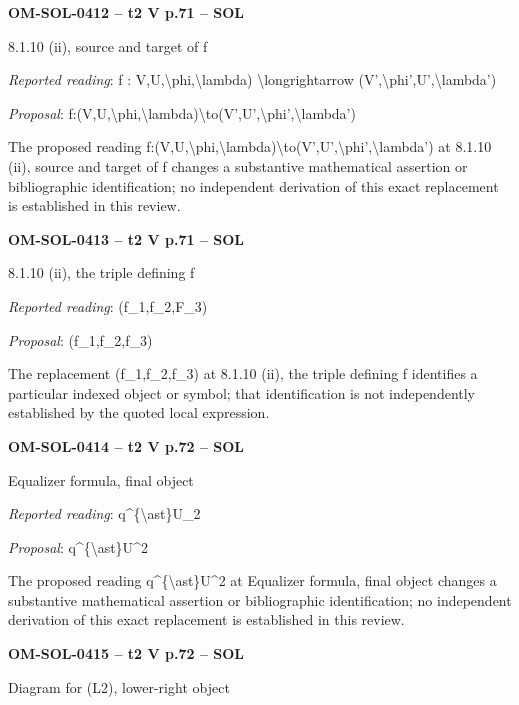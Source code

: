 \par\noindent\textbf{OM-SOL-0412 -- t2 V p.71 -- SOL}\par
8.1.10 (ii), source and target of f\par
\emph{Reported reading}: f : V,U,\textbackslash{}phi,\textbackslash{}lambda) \textbackslash{}longrightarrow (V',\textbackslash{}phi',U',\textbackslash{}lambda')\par
\emph{Proposal}: f:(V,U,\textbackslash{}phi,\textbackslash{}lambda)\textbackslash{}to(V',U',\textbackslash{}phi',\textbackslash{}lambda')\par
The proposed reading f:(V,U,\textbackslash{}phi,\textbackslash{}lambda)\textbackslash{}to(V',U',\textbackslash{}phi',\textbackslash{}lambda') at 8.1.10 (ii), source and target of f changes a substantive mathematical assertion or bibliographic identification; no independent derivation of this exact replacement is established in this review.\par
\par\noindent\textbf{OM-SOL-0413 -- t2 V p.71 -- SOL}\par
8.1.10 (ii), the triple defining f\par
\emph{Reported reading}: (f\_1,f\_2,F\_3)\par
\emph{Proposal}: (f\_1,f\_2,f\_3)\par
The replacement (f\_1,f\_2,f\_3) at 8.1.10 (ii), the triple defining f identifies a particular indexed object or symbol; that identification is not independently established by the quoted local expression.\par
\par\noindent\textbf{OM-SOL-0414 -- t2 V p.72 -- SOL}\par
Equalizer formula, final object\par
\emph{Reported reading}: q\textasciicircum{}\{\textbackslash{}ast\}U\_2\par
\emph{Proposal}: q\textasciicircum{}\{\textbackslash{}ast\}U\textasciicircum{}2\par
The proposed reading q\textasciicircum{}\{\textbackslash{}ast\}U\textasciicircum{}2 at Equalizer formula, final object changes a substantive mathematical assertion or bibliographic identification; no independent derivation of this exact replacement is established in this review.\par
\par\noindent\textbf{OM-SOL-0415 -- t2 V p.72 -- SOL}\par
Diagram for (L2), lower-right object\par

